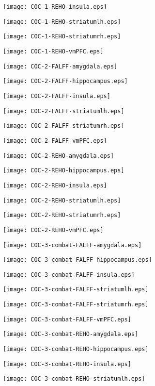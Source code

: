\documentclass{article}
\begin{document}

\newpage
\texttt{[image: COC-1-REHO-insula.eps]}

\newpage
\texttt{[image: COC-1-REHO-striatumlh.eps]}

\newpage
\texttt{[image: COC-1-REHO-striatumrh.eps]}

\newpage
\texttt{[image: COC-1-REHO-vmPFC.eps]}

\newpage
\texttt{[image: COC-2-FALFF-amygdala.eps]}

\newpage
\texttt{[image: COC-2-FALFF-hippocampus.eps]}

\newpage
\texttt{[image: COC-2-FALFF-insula.eps]}

\newpage
\texttt{[image: COC-2-FALFF-striatumlh.eps]}

\newpage
\texttt{[image: COC-2-FALFF-striatumrh.eps]}

\newpage
\texttt{[image: COC-2-FALFF-vmPFC.eps]}

\newpage
\texttt{[image: COC-2-REHO-amygdala.eps]}

\newpage
\texttt{[image: COC-2-REHO-hippocampus.eps]}

\newpage
\texttt{[image: COC-2-REHO-insula.eps]}

\newpage
\texttt{[image: COC-2-REHO-striatumlh.eps]}

\newpage
\texttt{[image: COC-2-REHO-striatumrh.eps]}

\newpage
\texttt{[image: COC-2-REHO-vmPFC.eps]}

\newpage
\texttt{[image: COC-3-combat-FALFF-amygdala.eps]}

\newpage
\texttt{[image: COC-3-combat-FALFF-hippocampus.eps]}

\newpage
\texttt{[image: COC-3-combat-FALFF-insula.eps]}

\newpage
\texttt{[image: COC-3-combat-FALFF-striatumlh.eps]}

\newpage
\texttt{[image: COC-3-combat-FALFF-striatumrh.eps]}

\newpage
\texttt{[image: COC-3-combat-FALFF-vmPFC.eps]}

\newpage
\texttt{[image: COC-3-combat-REHO-amygdala.eps]}

\newpage
\texttt{[image: COC-3-combat-REHO-hippocampus.eps]}

\newpage
\texttt{[image: COC-3-combat-REHO-insula.eps]}

\newpage
\texttt{[image: COC-3-combat-REHO-striatumlh.eps]}
\end{document}
